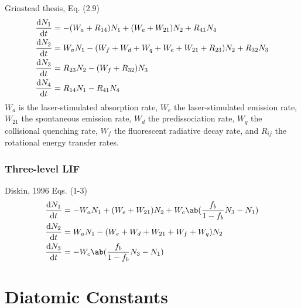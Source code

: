 \documentclass[11pt, twoside, fleqn]{report}
\begin{document}
    Grinstead thesis, Eq. (2.9)
    \begin{align*}
        \odv{N_{1}}{t} & = -(W_{a} + R_{14})N_{1} + (W_{e} + W_{21})N_{2} + R_{41}N_{4}                      \\
        \odv{N_{2}}{t} & = W_{a}N_{1} - (W_{f} + W_{d} + W_{q} + W_{e} + W_{21} + R_{23})N_{2} + R_{32}N_{3} \\
        \odv{N_{3}}{t} & = R_{23}N_{2} - (W_{f} + R_{32})N_{3}                                               \\
        \odv{N_{4}}{t} & = R_{14}N_{1} - R_{41}N_{4}
    \end{align*}
    $W_{a}$ is the laser-stimulated absorption rate, $W_{e}$ the laser-stimulated emission rate, $W_{21}$ the spontaneous emission rate, $W_{d}$ the predissociation rate, $W_{q}$ the collisional quenching rate, $W_{f}$ the fluorescent radiative decay rate, and $R_{ij}$ the rotational energy transfer rates.

    \subsection{Three-level LIF}

    Diskin, 1996 Eqs. (1-3)
    \begin{align*}
        \odv{N_{1}}{t} & = -W_{a}N_{1} + (W_{e} + W_{21})N_{2} + W_{c}\ab(\frac{f_{b}}{1 - f_{b}}N_{3} - N_{1}) \\
        \odv{N_{2}}{t} & = W_{a}N_{1} - (W_{e} + W_{d} + W_{21} + W_{f} + W_{q})N_{2}                           \\
        \odv{N_{3}}{t} & = -W_{c}\ab(\frac{f_{b}}{1 - f_{b}}N_{3} - N_{1})
    \end{align*}

    \appendix
    \chapter{Diatomic Constants}
    \label{a:diatomic_constants}
\end{document}
